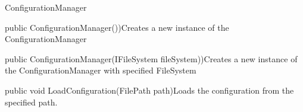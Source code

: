 \begin{class}{ConfigurationManager}


    
    \begin{constructors}
		\begin{constructor}{public ConfigurationManager())}{Creates a new instance of the ConfigurationManager}
		\end{constructor}
		\begin{constructor}{public ConfigurationManager(IFileSystem fileSystem))}{Creates a new instance of the ConfigurationManager with specified FileSystem}
			\begin{parameters}
			\end{parameters}
		\end{constructor}
	\end{constructors}

    \begin{methods}
        \begin{method}{public void LoadConfiguration(FilePath path)}{Loads the configuration from the specified path.}
            \begin{parameters}
            \end{parameters}
            \begin{exceptions}
            \end{exceptions}
        \end{method}
    \end{methods}
\end{class}

